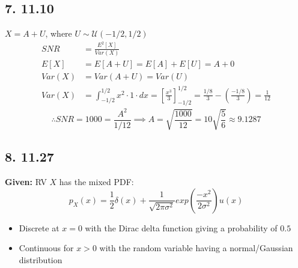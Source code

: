 \documentclass[12pt]{article}
\begin{document}
\subsection*{7. 11.10}
\label{subsec:1.7}

$X = A + U$, where $U \sim \mathcal{U}(-1/2, 1/2)$\\
\begin{align*}
    SNR &= \frac{E^2[X]}{Var(X)}\\[10pt]
    E[X] &= E[A + U] = E[A] + E[U] = A + 0 \\[10pt]
    Var(X) &= Var(A + U) = Var(U) \\[10pt]
    Var(X) &= \int_{-1/2}^{1/2} x^2 \cdot 1 \cdot dx = \left[\frac{x^3}{3}\right]_{-1/2}^{1/2} = \frac{1/8}{3} - \left(\frac{-1/8}{3}\right) = \frac{1}{12}
\end{align*}
\begin{equation*}
    \therefore SNR = 1000 = \frac{A^2}{1/12} \implies A = \sqrt{\frac{1000}{12}} = 10\sqrt{\frac{5}{6}} \approx 9.1287
\end{equation*}

\subsection*{8. 11.27}
\label{subsec:1.8}

\noindent \textbf{Given:} RV $X$ has the mixed PDF:
\[
p_X(x) = \frac{1}{2} \delta(x) + \frac{1}{\sqrt{2\pi\sigma^2}} exp\left(\frac{-x^2}{2\sigma^2}\right) u(x)
\]

\noindent
\begin{itemize}
    \item[] Discrete at $x=0$ with the Dirac delta function giving a probability of $0.5$ 
    \item[] Continuous for $x > 0$ with the random variable having a normal/Gaussian distribution 
\end{itemize}
\end{document}
